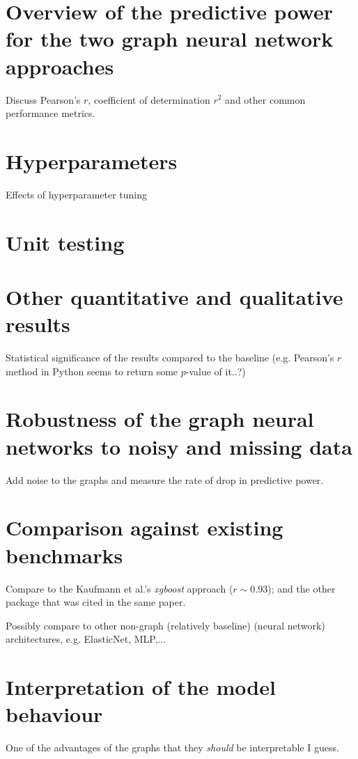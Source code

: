 \documentclass[12pt,a4paper,twoside, openright, hidelinks]{report}
\begin{document}
\section{Overview of the predictive power for the two graph neural network approaches}

Discuss Pearson's $r$, coefficient of determination $r^2$ and other common performance metrics.

\section{Hyperparameters}
Effects of hyperparameter tuning

\section{Unit testing}

\section{Other quantitative and qualitative results}
Statistical significance of the results compared to the baseline (e.g. Pearson's $r$ method in Python seems to return some $p$-value of it..?)

\section{Robustness of the graph neural networks to noisy and missing data}

Add noise to the graphs and measure the rate of drop in predictive power.

\section{Comparison against existing benchmarks}

Compare to the Kaufmann et al.'s \textit{xgboost} approach \cite{kaufmann2019} ($r \sim 0.93$); and the other package that was cited in the same paper.

Possibly compare to other non-graph (relatively baseline) (neural network) architectures, e.g. ElasticNet, MLP,...

\section{Interpretation of the model behaviour}
One of the advantages of the graphs that they \textit{should} be interpretable I guess.
\end{document}
